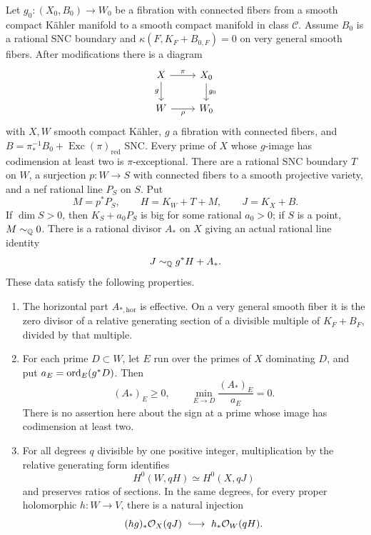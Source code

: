 \begin{lemma}
\label{rank:comparison}
Let \(g_0:(X_0,B_0)\to W_0\) be a fibration with connected fibers from
a smooth compact Kähler manifold to a smooth compact manifold in
class \(\mathcal C\).  Assume \(B_0\) is a rational SNC boundary and
\(\kappa(F,K_F+B_{0,F})=0\) on very general smooth fibers.
After modifications there is a diagram
\[
\begin{tikzcd}
 X \arrow[r,"\pi"] \arrow[d,"g"'] & X_0 \arrow[d,"g_0"]\\
 W \arrow[r,"\rho"'] & W_0
\end{tikzcd}
\]
with \(X,W\) smooth compact Kähler, \(g\) a fibration with connected
fibers, and
\(B=\pi_*^{-1}B_0+\operatorname{Exc}(\pi)_{\mathrm{red}}\) SNC.
Every prime of \(X\) whose \(g\)-image has codimension at least two is
\(\pi\)-exceptional.  There are a rational SNC boundary \(T\) on \(W\),
a surjection \(p:W\to S\) with connected fibers to a smooth projective
variety, and a nef rational line \(P_S\) on \(S\).  Put
\[
        M=p^*P_S,\qquad H=K_W+T+M,\qquad J=K_X+B.
\]
If \(\dim S>0\), then \(K_S+a_0P_S\) is big for some rational
\(a_0>0\); if \(S\) is a point, \(M\sim_{\mathbb Q}0\).
There is a rational divisor \(A_*\) on \(X\) giving an actual rational
line identity
\begin{equation}
                 J\sim_{\mathbb Q}g^*H+A_*.
\label{rank:line-comparison}
\end{equation}
These data satisfy the following properties.

\begin{enumerate}
\item The horizontal part \(A_{*,\mathrm{hor}}\) is effective.
On a very general smooth fiber it is the zero divisor of a relative
generating section of a divisible multiple of \(K_F+B_F\), divided
by that multiple.

\item For each prime \(D\subset W\), let \(E\) run over the primes of
\(X\) dominating \(D\), and put \(a_E=\operatorname{ord}_E(g^*D)\).
Then
\begin{equation}
 (A_*)_E\geq0,\qquad
       \min_{E\to D}\frac{(A_*)_E}{a_E}=0.
\label{rank:zero-minimum}
\end{equation}
There is no assertion here about the sign at a prime whose image has
codimension at least two.

\item For all degrees \(q\) divisible by one positive integer,
multiplication by the relative generating form identifies
\[
        H^0(W,qH)\simeq H^0(X,qJ)
\]
and preserves ratios of sections.  In the same degrees, for every
proper holomorphic \(h:W\to V\), there is a natural injection
\begin{equation}
 (hg)_*\OO_X(qJ)\ \lhook\joinrel\longrightarrow\
 h_*\OO_W(qH).
\label{rank:relative-injection}
\end{equation}


\end{enumerate}
\end{lemma}
